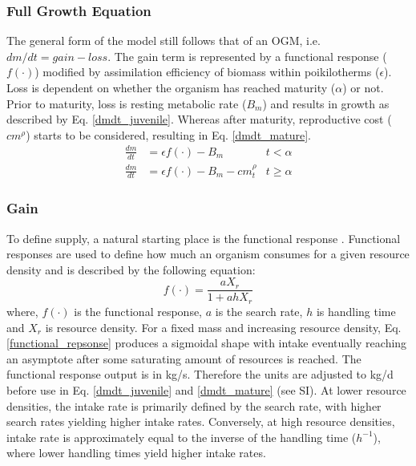 \documentclass[a4paper, 11pt, hidelinks]{article} %
\begin{document}
	\subsubsection{Full Growth Equation}
	The general form of the model still follows that of an OGM, i.e. $dm/dt = gain - loss$.  The gain term is represented by a functional response ($ f(\cdot)$) modified by assimilation efficiency of biomass within poikilotherms ($ \epsilon $).  Loss is dependent on whether the organism has reached maturity ($ \alpha $) or not.  Prior to maturity, loss is resting metabolic rate ($ B_m $) and results in growth as described by Eq. \ref{dmdt_juvenile}.  Whereas after maturity, reproductive cost ($ cm^\rho $) starts to be considered, resulting in Eq. \ref{dmdt_mature}.
	\begin{align}
	\label{dmdt_juvenile}
	\frac{dm}{dt} &= \epsilon f(\cdot) - B_m & t < \alpha \\
	\label{dmdt_mature}
	\frac{dm}{dt} &= \epsilon f(\cdot) - B_m - cm_t^\rho & t \geq \alpha
	\end{align}
	
	
	\subsubsection{Gain}
	To define supply, a natural starting place is the functional response \parencite{Holling1959}.  Functional responses  are used to define how much an organism consumes for a given resource density and is described by the following equation:	
	\begin{equation}
		\label{functional_repsonse}
		f(\cdot) = \frac{a X_r}{1 + a h X_r}
	\end{equation}
	where, $ f(\cdot) $ is the functional response, $ a $ is the search rate, $ h $ is handling time and $ X_r $ is resource density.  
	For a fixed mass and increasing resource density, Eq. \ref{functional_repsonse} produces a sigmoidal shape with intake eventually reaching an asymptote after some saturating amount of resources is reached.  The functional response output is in kg/s.  Therefore the units are adjusted to kg/d before use in Eq. \ref{dmdt_juvenile} and \ref{dmdt_mature} (see SI).  At lower resource densities, the intake rate is primarily defined by the search rate, with higher search rates yielding higher intake rates.  Conversely, at high resource densities, intake rate is approximately equal to the inverse of the handling time ($ h^{-1} $), where lower handling times yield higher intake rates.  
	
\end{document}
